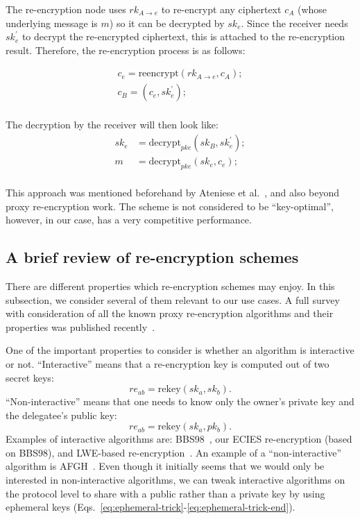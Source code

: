\documentclass[longbibliography,nofootinbib]{revtex4-1}
\begin{document}
The re-encryption node uses $rk_{A\rightarrow e}$ to re-encrypt any ciphertext $c_A$ (whose underlying message is $m$) so it can be decrypted by $sk_e$. Since the receiver needs $sk_e^{\prime}$ to decrypt the re-encrypted ciphertext, this is attached to the re-encryption result. Therefore, the re-encryption process is as follows:

\begin{align}
    c_e = \text{reencrypt}(rk_{A\rightarrow e}, c_{A});\\
    c_B = (c_e, sk_e^{\prime});\\
\end{align}


The decryption by the receiver will then look like:
\begin{align}
    sk_e &= \text{decrypt}_{pke}(sk_B, sk_e^{\prime});\\
    m &= \text{decrypt}_{pke}(sk_e, c_e);\\
\end{align}

This approach was mentioned beforehand by Ateniese et al.~\cite{AFGH}, and also beyond proxy re-encryption work.
The scheme is not considered to be ``key-optimal'', however, in our case, has a very competitive performance.

\subsection{A brief review of re-encryption schemes}

There are different properties which re-encryption schemes may enjoy.
In this subsection, we consider several of them relevant to our use cases.
A full survey with consideration of all the known proxy re-encryption algorithms and their properties was published recently~\cite{nunez2017proxy}.

One of the important properties to consider is whether an algorithm is interactive or not.
``Interactive'' means that a re-encryption key is computed out of two secret keys:
\begin{equation}
    re_{ab} = \text{rekey}(sk_a, sk_b).
\end{equation}
``Non-interactive'' means that one needs to know only the owner's private key and the delegatee's public key:
\begin{equation}
    re_{ab} = \text{rekey}(sk_a, pk_b).
\end{equation}
Examples of interactive algorithms are: BBS98~\cite{BBS98}, our ECIES re-encryption (based on BBS98), and LWE-based re-encryption~\cite{lwe-reencryption}.
An example of a ``non-interactive'' algorithm is AFGH~\cite{AFGH}.
Even though it initially seems that we would only be interested in non-interactive algorithms,
we can tweak interactive algorithms on the protocol level to share with a public rather than a private key by 
using ephemeral keys (Eqs.~\ref{eq:ephemeral-trick}-\ref{eq:ephemeral-trick-end}).
\end{document}
